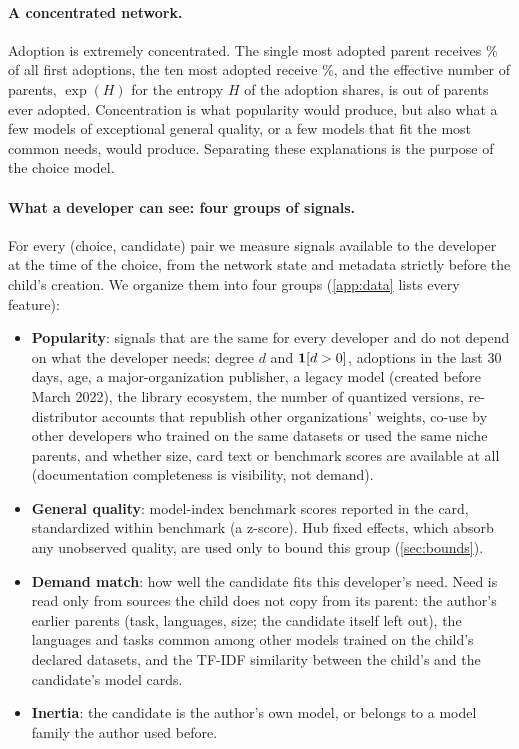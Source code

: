 \paragraph{A concentrated network.}
Adoption is extremely concentrated. The single most adopted parent receives \topOneReal\% of all first adoptions,
the ten most adopted receive \topTenReal\%, and the effective number of parents, $\exp(H)$ for the entropy $H$ of
the adoption shares, is \effReal{} out of \nFirstParents{} parents ever adopted. Concentration is what popularity
would produce, but also what a few models of exceptional general quality, or a few models that fit the most common
needs, would produce. Separating these explanations is the purpose of the choice model.

\paragraph{What a developer can see: four groups of signals.}
For every (choice, candidate) pair we measure signals available to the developer at the time of the choice, from the
network state and metadata strictly before the child's creation. We organize them into four groups
(\cref{app:data} lists every feature):
\begin{itemize}
\item \textbf{Popularity}: signals that are the same for every developer and do not depend on what the developer
needs: degree $d$ and $\mathbf{1}[d>0]$, adoptions in the last 30 days, age, a major-organization publisher, a legacy
model (created before March 2022), the library ecosystem, the number of quantized versions, re-distributor accounts that republish
other organizations' weights, co-use by other developers who trained on the same datasets or used the same niche
parents, and whether size, card text or benchmark scores are available at all (documentation completeness is
visibility, not demand).
\item \textbf{General quality}: model-index benchmark scores reported in the card, standardized within benchmark
(a z-score). Hub fixed effects, which absorb any unobserved quality, are used only to bound this group
(\cref{sec:bounds}).
\item \textbf{Demand match}: how well the candidate fits this developer's need. Need is read only from sources the
child does not copy from its parent: the author's earlier parents (task, languages, size; the candidate itself left
out), the languages and tasks common among other models trained on the child's declared datasets, and the TF-IDF
similarity between the child's and the candidate's model cards.
\item \textbf{Inertia}: the candidate is the author's own model, or belongs to a model family the author used before.
\end{itemize}

